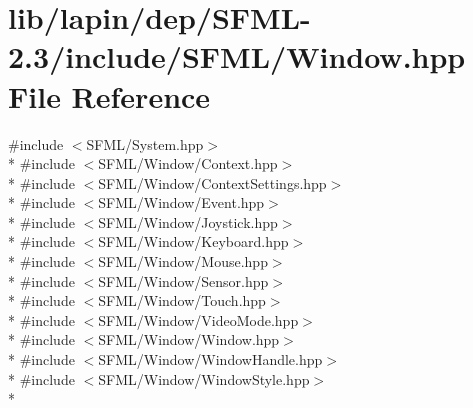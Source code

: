 \hypertarget{lapin_2dep_2_s_f_m_l-2_83_2include_2_s_f_m_l_2_window_8hpp}{\section{lib/lapin/dep/\-S\-F\-M\-L-\/2.3/include/\-S\-F\-M\-L/\-Window.hpp File Reference}
\label{lapin_2dep_2_s_f_m_l-2_83_2include_2_s_f_m_l_2_window_8hpp}
}
{\ttfamily \#include $<$S\-F\-M\-L/\-System.\-hpp$>$}\\*
{\ttfamily \#include $<$S\-F\-M\-L/\-Window/\-Context.\-hpp$>$}\\*
{\ttfamily \#include $<$S\-F\-M\-L/\-Window/\-Context\-Settings.\-hpp$>$}\\*
{\ttfamily \#include $<$S\-F\-M\-L/\-Window/\-Event.\-hpp$>$}\\*
{\ttfamily \#include $<$S\-F\-M\-L/\-Window/\-Joystick.\-hpp$>$}\\*
{\ttfamily \#include $<$S\-F\-M\-L/\-Window/\-Keyboard.\-hpp$>$}\\*
{\ttfamily \#include $<$S\-F\-M\-L/\-Window/\-Mouse.\-hpp$>$}\\*
{\ttfamily \#include $<$S\-F\-M\-L/\-Window/\-Sensor.\-hpp$>$}\\*
{\ttfamily \#include $<$S\-F\-M\-L/\-Window/\-Touch.\-hpp$>$}\\*
{\ttfamily \#include $<$S\-F\-M\-L/\-Window/\-Video\-Mode.\-hpp$>$}\\*
{\ttfamily \#include $<$S\-F\-M\-L/\-Window/\-Window.\-hpp$>$}\\*
{\ttfamily \#include $<$S\-F\-M\-L/\-Window/\-Window\-Handle.\-hpp$>$}\\*
{\ttfamily \#include $<$S\-F\-M\-L/\-Window/\-Window\-Style.\-hpp$>$}\\*
